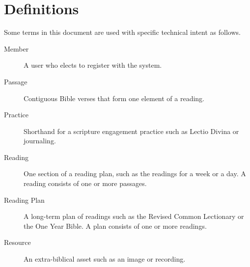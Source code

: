 \documentclass{article}
\begin{document}
\section{Definitions}
\label{sec:defs}

Some terms in this document are used with specific technical intent
as follows.

\begin{description}
\item[Member] A user who elects to register with the system.
\item[Passage] Contiguous Bible verses
 that form one element of a reading.
\item[Practice] Shorthand for a scripture engagement practice
  such as Lectio Divina or journaling.
\item[Reading] One section of a reading plan,
  such as the readings for a week or a day.
  A reading consists of one or more passages.
\item[Reading Plan] A long-term plan of readings
  such as the Revised Common Lectionary or the One Year Bible.
  A plan consists of one or more readings.
\item[Resource] An extra-biblical asset such as an image or recording.
\end{description}
\end{document}
